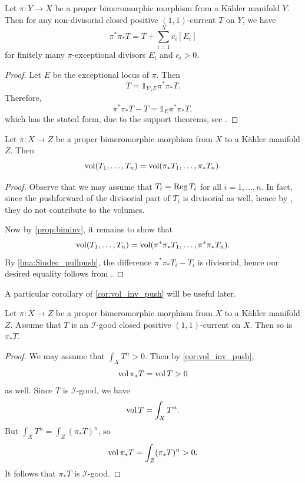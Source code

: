 \begin{lemma}\label{lma:Siudec_pullpush}
    Let $\pi\colon Y\rightarrow X$ be a proper bimeromorphic morphism from a Kähler manifold $Y$.
    Then for any non-divisorial closed positive $(1,1)$-current $T$ on $Y$, we have
    \[
    \pi^* \pi_* T=T+\sum_{i=1}^N c_i [E_i]
    \]
    for finitely many $\pi$-exceptional divisors $E_i$ and $c_i>0$.
\end{lemma}

\begin{proof}
    Let $E$ be the exceptional locus of $\pi$. Then
    \[
    T=\mathds{1}_{Y\setminus E}\pi^* \pi_* T.
    \]
    Therefore,
    \[
    \pi^* \pi_* T-T=\mathds{1}_E\pi^* \pi_* T,
    \]
    which has the stated form, due to the support theorems, see \cite[Section~8]{DemBook}.
\end{proof}

\begin{corollary}\label{cor:vol_inv_push}
    Let $\pi\colon X\rightarrow Z$ be a proper bimeromorphic morphism from $X$ to a Kähler manifold $Z$. Then
    \begin{equation}\label{eq:volpushinc}
    \operatorname{vol}(T_1,\ldots,T_n)=\operatorname{vol}(\pi_*T_1,\ldots,\pi_*T_n).
    \end{equation}
\end{corollary}
\begin{proof}
    Observe that we may assume that $T_i=\operatorname{Reg} T_i$ for all $i=1,\ldots,n$. In fact, since the pushforward of the divisorial part of $T_i$ is divisorial as well, hence by , they do not contribute to the volumes.

    Now by \cref{prop:biminv}, it remains to show that
    \[
    \operatorname{vol}(T_1,\ldots,T_n)=\operatorname{vol}(\pi^*\pi_*T_1,\ldots,\pi^*\pi_*T_n).
    \]
    By \cref{lma:Siudec_pullpush}, the difference $\pi^*\pi_*T_i-T_i$ is divisorial, hence our desired equality follows from .
\end{proof}

A particular corollary of \cref{cor:vol_inv_push} will be useful later.
\begin{corollary}\label{cor:Igoodpush}
     Let $\pi\colon X\rightarrow Z$ be a proper bimeromorphic morphism from $X$ to a Kähler manifold $Z$. Assume that $T$ is an $\mathcal{I}$-good closed positive $(1,1)$-current on $X$. Then so is $\pi_*T$.
\end{corollary}
\begin{proof}
    We may assume that $\int_X T^n>0$. Then by \cref{cor:vol_inv_push},
    \[
    \operatorname{vol} \pi_*T=\operatorname{vol} T>0
    \]
    as well.
    Since $T$ is $\mathcal{I}$-good, we have
    \[
    \operatorname{vol} T=\int_X T^n.
    \]
    But $\int_X T^n=\int_Z (\pi_*T)^n$, so
    \[
    \operatorname{vol} \pi_*T=\int_Z (\pi_*T)^n>0.
    \]
    It follows that $\pi_*T$ is $\mathcal{I}$-good.
\end{proof}


